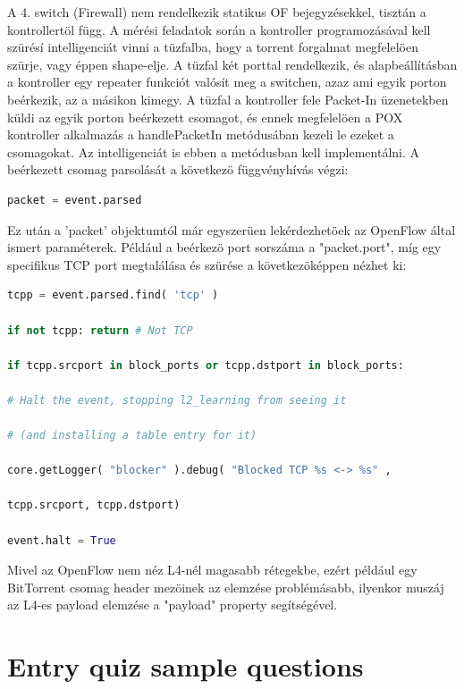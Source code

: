 \documentclass[a4paper]{article}
\begin{document}
A 4. switch (Firewall) nem rendelkezik statikus OF bejegyzésekkel, tisztán a kontrollertöl függ. A mérési feladatok
során a kontroller programozásával kell szürésí intelligenciát vinni a tüzfalba, hogy a torrent forgalmat megfelelöen
szürje, vagy éppen shape-elje. A tüzfal két porttal rendelkezik, és alapbeállításban a kontroller egy repeater funkciót
valósít meg a switchen, azaz ami egyik porton beérkezik, az a másikon kimegy. A tüzfal a kontroller fele Packet-In
üzenetekben küldi az egyik porton beérkezett csomagot, és ennek megfelelöen a POX kontroller alkalmazás a
handlePacketIn metódusában kezeli le ezeket a csomagokat. Az intelligenciát is ebben a metódusban kell implementálni. A
beérkezett csomag parsolását a következö függvényhívás végzi:
\begin{lstlisting}[language=python,frame=single,breaklines]
packet = event.parsed  
\end{lstlisting}

Ez után a 'packet' objektumtól már egyszerüen lekérdezhetöek az OpenFlow által ismert paraméterek. Például a beérkezö
port sorszáma a "packet.port", míg egy specifikus TCP port megtalálása és szürése a következöképpen nézhet ki:

\begin{lstlisting}[language=python,frame=single,breaklines]
tcpp = event.parsed.find( 'tcp' )

if not tcpp: return # Not TCP

if tcpp.srcport in block_ports or tcpp.dstport in block_ports:

# Halt the event, stopping l2_learning from seeing it

# (and installing a table entry for it)

core.getLogger( "blocker" ).debug( "Blocked TCP %s <-> %s" ,

tcpp.srcport, tcpp.dstport)

event.halt = True
\end{lstlisting}

Mivel az OpenFlow nem néz L4-nél magasabb rétegekbe, ezért például egy BitTorrent csomag header mezöinek az elemzése
problémásabb, ilyenkor muszáj az L4-es payload elemzése a "payload" property segítségével.

\appendix

\section{Entry quiz sample questions}
\end{document}
